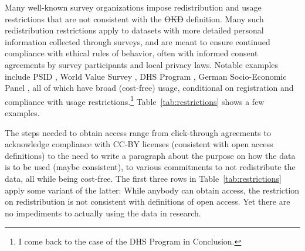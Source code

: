 \documentclass{article}
\providecommand{\DIFadd}[1]{{\protect\color{blue}\uwave{#1}}} %
\providecommand{\DIFdel}[1]{{\protect\color{red}\sout{#1}}} %
\providecommand{\DIFaddbegin}{} %
\providecommand{\DIFaddend}{} %
\providecommand{\DIFdelbegin}{} %
\providecommand{\DIFdelend}{} %
\begin{document}
Many well-known survey organizations impose redistribution and usage restrictions that are not consistent with the \DIFdelbegin \DIFdel{OKD }\DIFdelend \DIFaddbegin \DIFadd{OKF }\DIFaddend definition. Many such redistribution restrictions apply to datasets with more detailed personal information collected through surveys, and are meant to ensure continued compliance with ethical rules of behavior, often with informed consent agreements by survey participants and local privacy laws. Notable examples include  PSID \parencite{institute_for_social_research_panel_2024}, World Value Survey \parencite{haerpfer_world_2024}, \ac{DHS} Program \parencite{dhs_program_demographic_2024}, German Socio-Economic Panel \parencite{goebel_german_2019,goebel_socio-economic_2024}, all of which have broad (cost-free) usage, conditional on registration and compliance with usage restrictions.\footnote{I come back to the case of the \ac{DHS} Program in Conclusion.} Table~\ref{tab:restrictions} shows a few examples. 



The steps needed to obtain access range from click-through agreements to acknowledge compliance with CC-BY licenses (consistent with open access definitions) to the need to write a paragraph about the purpose on how the data is to be used (maybe consistent), to various commitments to not redistribute the data, all while being cost-free. The first three rows in Table~\ref{tab:restrictions} apply some variant of the latter: While anybody can obtain access, the restriction on redistribution is not consistent with definitions of open access. Yet there are no impediments to actually using the data in research. 
\end{document}

